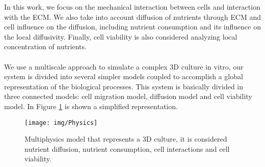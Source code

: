 In this work, we focus on the mechanical interaction between cells and interaction with the ECM. We also take into account diffusion of nutrients through ECM and cell influence on the diffusion, including nutrient consumption and its influence on the local diffusivity. Finally, cell viability is also considered analyzing local concentration of nutrients.\\
\\
We use a multiscale approach to simulate a complex 3D culture in vitro, our system is divided into several simpler models coupled to accomplish a global representation of the biological processes. This system is basically divided in three connected models: cell migration model, diffusion model and cell viability model. In Figure \ref{fig:physics} is shown a simplified representation.\\


\begin{figure}[h]
\centering
\setlength\fboxsep{0pt}
\setlength\fboxrule{0.5pt}
\texttt{[image: img/Physics]}
\caption{Multiphysics model that represents a 3D culture, it is considered nutrient diffusion, nutrient consumption, cell interactions and cell viability.}
\label{fig:physics}
\end{figure}
